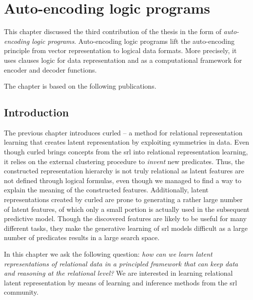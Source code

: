 \chapter{Auto-encoding logic programs}\label{ch:alps}


This chapter discussed the third contribution of the thesis in the form of \textit{auto-encoding logic programs}.
Auto-encoding logic programs lift the auto-encoding principle from vector representation to logical data formats.
More precisely, it uses clauses logic for data representation and  as a computational framework for encoder and decoder functions.


The chapter is based on the following publications.

\begin{quote}
\end{quote}

\begin{quote}
\end{quote}



\section{Introduction}




The previous chapter introduces \gls{curled} -- a method for relational representation learning that creates latent representation by exploiting symmetries in data.
Even though \gls{curled} brings concepts from the \gls{srl} into relational representation learning, it relies on the external clustering procedure to \textit{invent} new predicates.
Thus, the constructed representation hierarchy  is not truly relational as latent features are not defined through logical formulas, even though we managed to find a way to explain the meaning of the constructed features.
Additionally, latent representations created by \gls{curled} are prone to generating a rather large number of latent features, of which only a small portion  is actually used in the subsequent predictive model.
Though the discovered features are likely to be useful for many different tasks, they make the generative learning of \gls{srl} models difficult as a large number of predicates results in a large search space.





In this chapter we ask the following question: \textit{how can we learn latent representations of relational data in a principled framework that can keep data and reasoning at the relational level?}
We are interested in learning relational latent representation by means of learning and inference methods from the \gls{srl} community.



